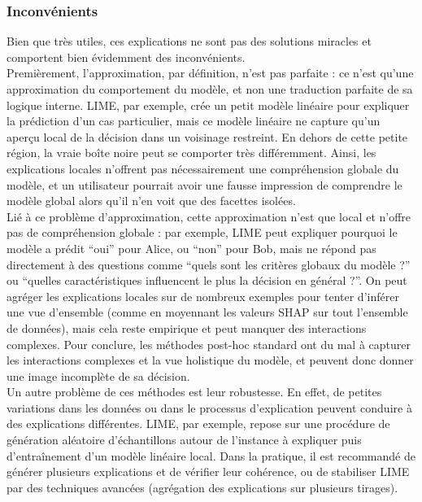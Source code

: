 \documentclass{article}
\begin{document}
    \subsubsection{Inconvénients}

    \quad Bien que très utiles, ces explications ne sont pas des solutions miracles et comportent bien évidemment des inconvénients.\\
    
    Premièrement, l'approximation, par définition, n’est pas parfaite : ce n’est qu’une approximation du comportement du modèle, et non une traduction parfaite de sa logique interne. LIME, par exemple, crée un petit modèle linéaire pour expliquer la prédiction d’un cas particulier, mais ce modèle linéaire ne capture qu’un aperçu local de la décision dans un voisinage restreint. En dehors de cette petite région, la vraie boîte noire peut se comporter très différemment. Ainsi, les explications locales n’offrent pas nécessairement une compréhension globale du modèle, et un utilisateur pourrait avoir une fausse impression de comprendre le modèle global alors qu’il n’en voit que des facettes isolées.\\
    
    Lié à ce problème d’approximation, cette approximation n’est que local et n’offre pas de compréhension globale : par exemple, LIME peut expliquer pourquoi le modèle a prédit “oui” pour Alice, ou “non” pour Bob, mais ne répond pas directement à des questions comme “quels sont les critères globaux du modèle ?” ou “quelles caractéristiques influencent le plus la décision en général ?”. On peut agréger les explications locales sur de nombreux exemples pour tenter d’inférer une vue d’ensemble (comme en moyennant les valeurs SHAP sur tout l’ensemble de données), mais cela reste empirique et peut manquer des interactions complexes. Pour conclure, les méthodes post-hoc standard ont du mal à capturer les interactions complexes et la vue holistique du modèle, et peuvent donc donner une image incomplète de sa décision.\\
    
    Un autre problème de ces méthodes est leur robustesse. En effet, de petites variations dans les données ou dans le processus d’explication peuvent conduire à des explications différentes. LIME, par exemple, repose sur une procédure de génération aléatoire d’échantillons autour de l’instance à expliquer puis d’entraînement d’un modèle linéaire local. Dans la pratique, il est recommandé de générer plusieurs explications et de vérifier leur cohérence, ou de stabiliser LIME par des techniques avancées (agrégation des explications sur plusieurs tirages).\\
    
\end{document}
